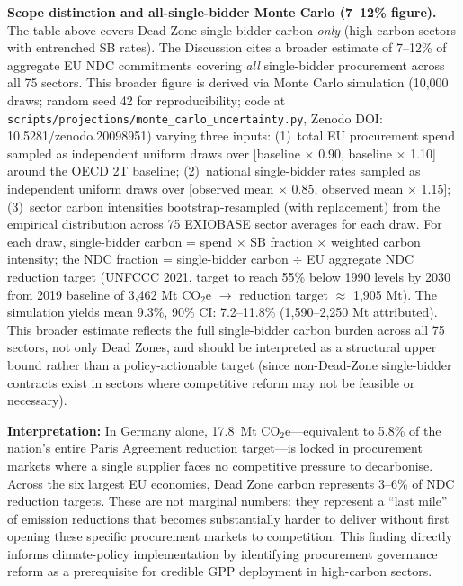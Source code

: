 \documentclass[11pt]{article}
\begin{document}
\textbf{Scope distinction and all-single-bidder Monte Carlo (7--12\% figure).} The table above covers Dead Zone single-bidder carbon \textit{only} (high-carbon sectors with entrenched SB rates). The Discussion cites a broader estimate of 7--12\% of aggregate EU NDC commitments covering \textit{all} single-bidder procurement across all 75 sectors. This broader figure is derived via Monte Carlo simulation (10,000 draws; random seed 42 for reproducibility; code at \texttt{scripts/projections/monte\_carlo\_uncertainty.py}, Zenodo DOI: 10.5281/zenodo.20098951) varying three inputs: (1)~total EU procurement spend sampled as independent uniform draws over [baseline $\times$ 0.90, baseline $\times$ 1.10] around the OECD \texteuro2T baseline; (2)~national single-bidder rates sampled as independent uniform draws over [observed mean $\times$ 0.85, observed mean $\times$ 1.15]; (3)~sector carbon intensities bootstrap-resampled (with replacement) from the empirical distribution across 75 EXIOBASE sector averages for each draw. For each draw, single-bidder carbon = spend $\times$ SB fraction $\times$ weighted carbon intensity; the NDC fraction = single-bidder carbon $\div$ EU aggregate NDC reduction target (UNFCCC 2021, target to reach 55\% below 1990 levels by 2030 from 2019 baseline of 3,462 Mt CO$_2$e $\rightarrow$ reduction target $\approx$ 1,905 Mt). The simulation yields mean 9.3\%, 90\% CI: 7.2--11.8\% (1,590--2,250 Mt attributed). This broader estimate reflects the full single-bidder carbon burden across all 75 sectors, not only Dead Zones, and should be interpreted as a structural upper bound rather than a policy-actionable target (since non-Dead-Zone single-bidder contracts exist in sectors where competitive reform may not be feasible or necessary).

\textbf{Interpretation:} In Germany alone, 17.8~Mt CO$_2$e---equivalent to 5.8\% of the nation's entire Paris Agreement reduction target---is locked in procurement markets where a single supplier faces no competitive pressure to decarbonise. Across the six largest EU economies, Dead Zone carbon represents 3--6\% of NDC reduction targets. These are not marginal numbers: they represent a ``last mile'' of emission reductions that becomes substantially harder to deliver without first opening these specific procurement markets to competition. This finding directly informs climate-policy implementation by identifying procurement governance reform as a prerequisite for credible GPP deployment in high-carbon sectors.

\end{document}
